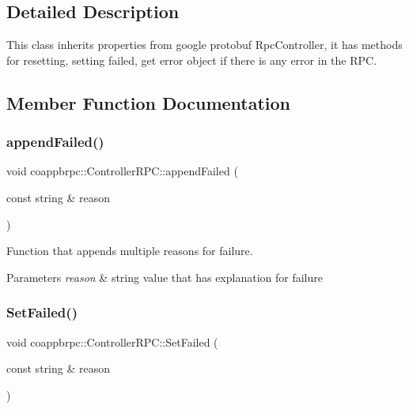 \subsection{Detailed Description}
This class inherits properties from google protobuf Rpc\+Controller, it has methods for resetting, setting failed, get error object if there is any error in the R\+PC. 

\subsection{Member Function Documentation}
\mbox{\label{classcoappbrpc_1_1ControllerRPC_a480586532b344e3ca8da2d2519ba593f}} 
\subsubsection{\texorpdfstring{append\+Failed()}{appendFailed()}}
{\footnotesize\ttfamily void coappbrpc\+::\+Controller\+R\+P\+C\+::append\+Failed (\begin{DoxyParamCaption}\item[{const string \&}]{reason }\end{DoxyParamCaption})\hspace{0.3cm}{\ttfamily [inline]}}



Function that appends multiple reasons for failure. 


\begin{DoxyParams}{Parameters}
{\em reason} & string value that has explanation for failure \\
\hline
\end{DoxyParams}
\mbox{\label{classcoappbrpc_1_1ControllerRPC_a3d91a6d0ba16232c531c3313e4412212}} 
\subsubsection{\texorpdfstring{Set\+Failed()}{SetFailed()}}
{\footnotesize\ttfamily void coappbrpc\+::\+Controller\+R\+P\+C\+::\+Set\+Failed (\begin{DoxyParamCaption}\item[{const string \&}]{reason }\end{DoxyParamCaption})\hspace{0.3cm}{\ttfamily [inline]}}



